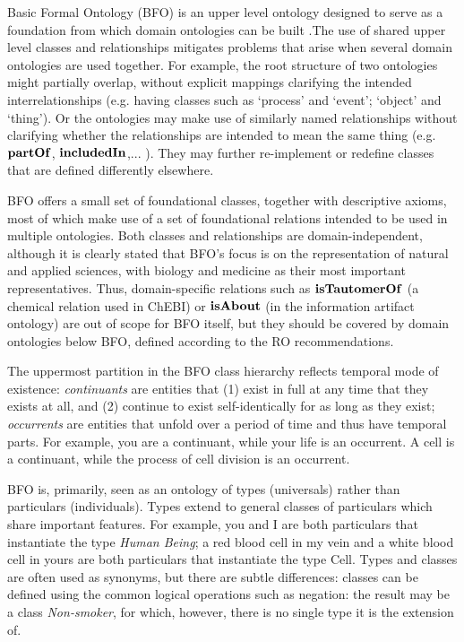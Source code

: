 Basic Formal Ontology (BFO) is an upper level ontology designed to serve as a foundation from which domain ontologies can be built \cite{BFO2:Graz}.The use of shared upper level classes and relationships mitigates problems that arise when several domain ontologies are used together.
For example, the root structure of two ontologies might partially overlap, without explicit mappings clarifying the intended interrelationships (e.g. having classes such as `process' and `event'; `object' and `thing'). Or the ontologies may make use of similarly named relationships without clarifying whether the relationships are intended to mean the same thing (e.g. $\mathrm{\mathbf{partOf}}$, $\mathrm{\mathbf{includedIn}}$,... ). They may further re-implement or redefine classes that are defined differently elsewhere.

BFO offers a small set of foundational classes, together with descriptive axioms, most of which make use of a set of foundational relations
intended to be used in multiple ontologies. Both classes and relationships are domain-independent, although it is clearly stated that BFO's focus is on the representation of natural and applied sciences, with biology and medicine as their most important representatives.  
Thus, domain-specific relations such as $\mathrm{\mathbf{isTautomerOf}}$ (a chemical relation used in ChEBI) or $\mathrm{\mathbf{isAbout}}$ (in the information artifact ontology) are out of scope for BFO itself, but they should be covered by domain ontologies below BFO, defined according to the RO recommendations.  

The uppermost partition in the BFO class hierarchy reflects temporal mode of existence: \textit{continuants} are entities that (1) exist in full at any time that they exists at all, and (2) continue to exist self-identically for as long as they exist; \textit{occurrents} are entities that unfold over a period of time and thus have temporal parts. For example, you are a continuant, while your life is an occurrent.  A cell is a continuant, while the process of cell division is an occurrent.  

BFO is, primarily, seen as an ontology of types (universals) rather than particulars (individuals). Types extend to general classes of particulars which share important features. For example, you and I are both particulars that instantiate the type \emph{Human Being}; a red blood cell in my vein and a white blood cell in yours are both particulars that instantiate the type Cell. Types and classes are often used as synonyms, but there are subtle differences: classes can be defined using the common logical operations such as negation: the result may be a class \emph{Non-smoker}, for which, however, there is no single type it is the extension of.  

